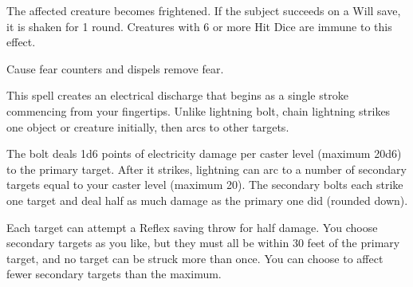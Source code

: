 \begin{multicols}{2}
\begin{small}
\noindent The affected creature becomes frightened. If the subject succeeds on a Will save, it is shaken for 1 round. Creatures with 6 or more Hit Dice are immune to this effect.

\smallskip\noindent Cause fear counters and dispels remove fear.

\noindent This spell creates an electrical discharge that begins as a single stroke commencing from your fingertips. Unlike lightning bolt, chain lightning strikes one object or creature initially, then arcs to other targets.

\smallskip\noindent The bolt deals 1d6 points of electricity damage per caster level (maximum 20d6) to the primary target. After it strikes, lightning can arc to a number of secondary targets equal to your caster level (maximum 20). The secondary bolts each strike one target and deal half as much damage as the primary one did (rounded down).

\smallskip\noindent Each target can attempt a Reflex saving throw for half damage. You choose secondary targets as you like, but they must all be within 30 feet of the primary target, and no target can be struck more than once. You can choose to affect fewer secondary targets than the maximum.



\end{small}
\end{multicols}
